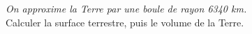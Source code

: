 
\textit{On approxime la Terre par une boule de rayon 6340 km.}\\
Calculer la surface terrestre, puis le volume de la Terre. 